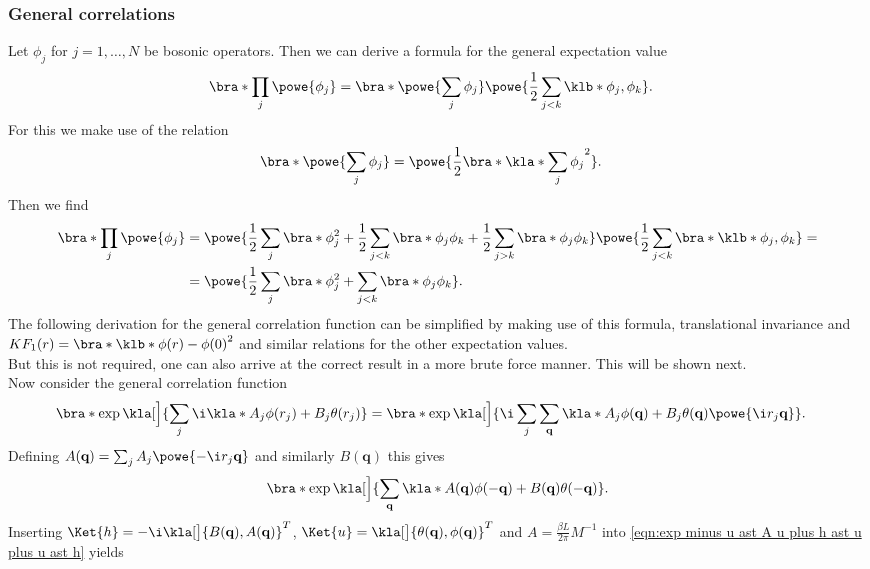 \documentclass[english, parskip=full]{scrartcl}
\begin{document}
\subsubsection{General correlations}
Let $\phi_j$ for $j=1,\dots,N$ be bosonic operators.
Then we can derive a formula for the general expectation value
\begin{align}
\bra*{\prod_j \powe{\phi_j}} &= \bra*{\powe{\sum_j \phi_j}} \powe{\frac{1}{2} \sum_{j<k} \klb*{\phi_j, \phi_k}}.
\end{align}
For this we make use of the relation
\begin{align}
\bra*{\powe{\sum_j \phi_j}} &= \powe{\frac{1}{2} \bra*{\kla*{\sum_j \phi_j}^2}}.
\end{align}
Then we find
\begin{align}
\bra*{\prod_j \powe{\phi_j}} &= \powe{\frac{1}{2} \sum_j \bra*{\phi_j^2} + \frac{1}{2} \sum_{j<k} \bra*{\phi_j\phi_k} + \frac{1}{2} \sum_{j>k} \bra*{\phi_j\phi_k}} \powe{\frac{1}{2} \sum_{j<k} \bra*{\klb*{\phi_j, \phi_k}}} = \\
&= \powe{\frac{1}{2} \sum_j \bra*{\phi_j^2} + \sum_{j<k} \bra*{\phi_j \phi_k}}.
\end{align}
The following derivation for the general correlation function can be simplified by making use of this formula, translational invariance and $KF_1(r) = \bra*{\klb*{\phi(r) - \phi(0)}^2}$ and similar relations for the other expectation values.\\
But this is not required, one can also arrive at the correct result in a more brute force manner.
This will be shown next.\\
Now consider the general correlation function
\begin{align}
\bra*{\exp\kla[\Big]{\sum_j \i\kla*{A_j \phi(r_j) + B_j\theta(r_j)} } } &= \bra*{\exp\kla[\Big]{\i \sum_j \sum_\textbf{q} \kla*{A_j\phi(\textbf{q}) + B_j \theta(\textbf{q})} \powe{\i r_j\textbf{q}} }}.
\end{align}
Defining $A(\textbf{q}) = \sum_j A_j \powe{-\i r_j\textbf{q}}$ and similarly $B(\textbf{q})$ this gives
\begin{align}
\bra*{\exp \kla[\Big]{\sum_\textbf{q} \kla*{A(\textbf{q}) \phi(-\textbf{q}) + B(\textbf{q}) \theta(-\textbf{q})}} }  .
\end{align}
Inserting $\Ket{h} = -\i\kla[\big]{B(\textbf{q}), A(\textbf{q})}^T$, $\Ket{u} = \kla[\big]{\theta(\textbf{q}), \phi(\textbf{q})}^T$ and $A= \frac{\beta L}{2\pi} M^{-1}$ into \autoref{eqn:exp minus u ast A u plus h ast u plus u ast h} yields
\end{document}
